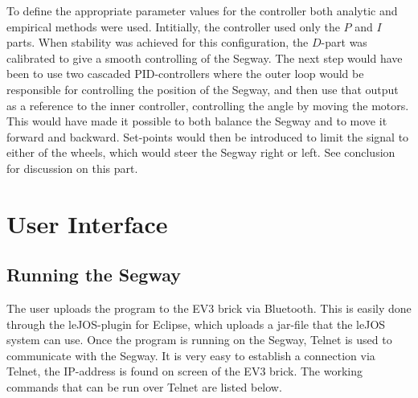 To define the appropriate parameter values for the controller both analytic and empirical methods were used. Intitially, the controller used only the $P$ and $I$ parts. When stability was achieved for this configuration, the $D$-part was calibrated to give a smooth controlling of the Segway. The next step would have been to use two cascaded PID-controllers where the outer loop would be responsible for controlling the position of the Segway, and then use that output as a reference to the inner controller, controlling the angle by moving the motors. This would have made it possible to both balance the Segway and to move it forward and backward. Set-points would then be introduced to limit the signal to either of the wheels, which would steer the Segway right or left. See conclusion for discussion on this part.






\section{User Interface}

\subsection{Running the Segway}


The user uploads the program to the EV3 brick via Bluetooth. This is easily done through the leJOS-plugin for Eclipse, which uploads a jar-file that the leJOS system can use.
Once the program is running on the Segway, Telnet is used to communicate with the Segway. It is very easy to establish a connection via Telnet, the IP-address is found on screen of the EV3 brick. The working commands that can be run over Telnet are listed below.

